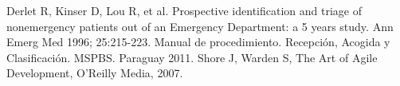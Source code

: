 \documentclass[a4paper,10pt]{article}
\begin{document}
\newpage 

\begin{thebibliography}{3} 
\bibitem{} Derlet R, Kinser D, Lou R, et al. Prospective identification and triage of nonemergency patients out of an Emergency Department: a 5 years study. Ann Emerg Med 1996; 25:215-223.
\bibitem{} Manual de procedimiento. Recepción,  Acogida y Clasificación.  MSPBS. Paraguay 2011.
\bibitem{} Shore J, Warden S, The Art of Agile Development, O’Reilly Media, 2007.

\end{thebibliography}
 
\end{document}
